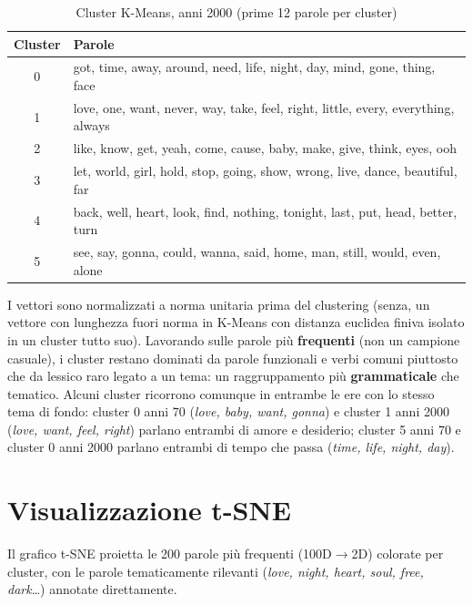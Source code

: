 \documentclass[12pt,a4paper]{article}
\begin{document}
\begin{table}[H]
  \centering
  \caption{Cluster K-Means, anni 2000 (prime 12 parole per cluster)}
  \small
  \begin{tabular}{c>{\raggedright\arraybackslash}p{11.5cm}}
    \toprule
    \textbf{Cluster} & \textbf{Parole} \\
    \midrule
    0 & got, time, away, around, need, life, night, day, mind, gone, thing, face \\
    1 & love, one, want, never, way, take, feel, right, little, every, everything, always \\
    2 & like, know, get, yeah, come, cause, baby, make, give, think, eyes, ooh \\
    3 & let, world, girl, hold, stop, going, show, wrong, live, dance, beautiful, far \\
    4 & back, well, heart, look, find, nothing, tonight, last, put, head, better, turn \\
    5 & see, say, gonna, could, wanna, said, home, man, still, would, even, alone \\
    \bottomrule
  \end{tabular}
\end{table}

I vettori sono normalizzati a norma unitaria prima del clustering (senza, un vettore con lunghezza fuori norma in K-Means con distanza euclidea finiva isolato in un cluster tutto suo). Lavorando sulle parole pi\`u \textbf{frequenti} (non un campione casuale), i cluster restano dominati da parole funzionali e verbi comuni piuttosto che da lessico raro legato a un tema: un raggruppamento pi\`u \textbf{grammaticale} che tematico. Alcuni cluster ricorrono comunque in entrambe le ere con lo stesso tema di fondo: cluster 0 anni 70 (\textit{love, baby, want, gonna}) e cluster 1 anni 2000 (\textit{love, want, feel, right}) parlano entrambi di amore e desiderio; cluster 5 anni 70 e cluster 0 anni 2000 parlano entrambi di tempo che passa (\textit{time, life, night, day}).

\section{Visualizzazione t-SNE}

Il grafico t-SNE proietta le 200 parole pi\`u frequenti (100D$\to$2D) colorate per cluster, con le parole tematicamente rilevanti (\textit{love, night, heart, soul, free, dark}\ldots) annotate direttamente.
\end{document}
